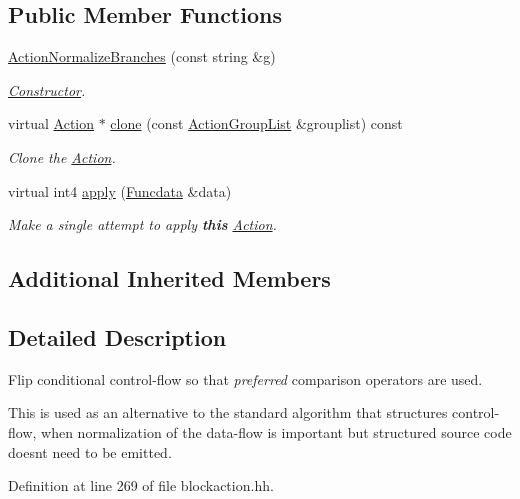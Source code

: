 \subsection*{Public Member Functions}
\begin{DoxyCompactItemize}
\item 
\mbox{\hyperlink{class_action_normalize_branches_a6a8cbf253362ca7659b0c6462c274d7d}{Action\+Normalize\+Branches}} (const string \&g)
\begin{DoxyCompactList}\small\item\em \mbox{\hyperlink{class_constructor}{Constructor}}. \end{DoxyCompactList}\item 
virtual \mbox{\hyperlink{class_action}{Action}} $\ast$ \mbox{\hyperlink{class_action_normalize_branches_a74bdc9457fe995592298c253dbf9fd88}{clone}} (const \mbox{\hyperlink{class_action_group_list}{Action\+Group\+List}} \&grouplist) const
\begin{DoxyCompactList}\small\item\em Clone the \mbox{\hyperlink{class_action}{Action}}. \end{DoxyCompactList}\item 
virtual int4 \mbox{\hyperlink{class_action_normalize_branches_a311d3d577d32dbe0f4c3dc23b731a035}{apply}} (\mbox{\hyperlink{class_funcdata}{Funcdata}} \&data)
\begin{DoxyCompactList}\small\item\em Make a single attempt to apply {\bfseries{this}} \mbox{\hyperlink{class_action}{Action}}. \end{DoxyCompactList}\end{DoxyCompactItemize}
\subsection*{Additional Inherited Members}


\subsection{Detailed Description}
Flip conditional control-\/flow so that {\itshape preferred} comparison operators are used. 

This is used as an alternative to the standard algorithm that structures control-\/flow, when normalization of the data-\/flow is important but structured source code doesn\textquotesingle{}t need to be emitted. 

Definition at line 269 of file blockaction.\+hh.



